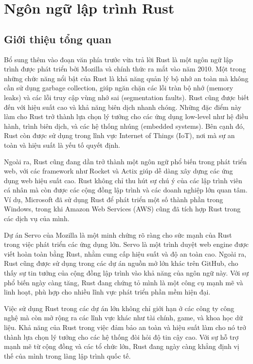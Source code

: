 \section{Ngôn ngữ lập trình Rust}

\subsection{Giới thiệu tổng quan}

Bổ sung thêm vào đoạn văn phía trước vừa trả lời
Rust là một ngôn ngữ lập trình được phát triển bởi Mozilla và chính thức ra mắt vào năm 2010. Một trong những chức năng nổi bật của Rust là khả năng quản lý bộ nhớ an toàn mà không cần sử dụng garbage collection, giúp ngăn chặn các lỗi tràn bộ nhớ (memory leaks) và các lỗi truy cập vùng nhớ sai (segmentation faults). Rust cũng được biết đến với hiệu suất cao và khả năng biên dịch nhanh chóng. Những đặc điểm này làm cho Rust trở thành lựa chọn lý tưởng cho các ứng dụng low-level như hệ điều hành, trình biên dịch, và các hệ thống nhúng (embedded systems). Bên cạnh đó, Rust còn được sử dụng trong lĩnh vực Internet of Things (IoT), nơi mà sự an toàn và hiệu suất là yếu tố quyết định.

Ngoài ra, Rust cũng đang dần trở thành một ngôn ngữ phổ biến trong phát triển web, với các framework như Rocket và Actix giúp dễ dàng xây dựng các ứng dụng web hiệu suất cao. Rust không chỉ thu hút sự chú ý của các lập trình viên cá nhân mà còn được các cộng đồng lập trình và các doanh nghiệp lớn quan tâm. Ví dụ, Microsoft đã sử dụng Rust để phát triển một số thành phần trong Windows, trong khi Amazon Web Services (AWS) cũng đã tích hợp Rust trong các dịch vụ của mình.

Dự án Servo của Mozilla là một minh chứng rõ ràng cho sức mạnh của Rust trong việc phát triển các ứng dụng lớn. Servo là một trình duyệt web engine được viết hoàn toàn bằng Rust, nhằm cung cấp hiệu suất và độ an toàn cao. Ngoài ra, Rust cũng được sử dụng trong các dự án nguồn mở lớn khác trên GitHub, cho thấy sự tin tưởng của cộng đồng lập trình vào khả năng của ngôn ngữ này. Với sự phổ biến ngày càng tăng, Rust đang chứng tỏ mình là một công cụ mạnh mẽ và linh hoạt, phù hợp cho nhiều lĩnh vực phát triển phần mềm hiện đại.

Việc sử dụng Rust trong các dự án lớn không chỉ giới hạn ở các công ty công nghệ mà còn mở rộng ra các lĩnh vực khác như tài chính, game, và khoa học dữ liệu. Khả năng của Rust trong việc đảm bảo an toàn và hiệu suất làm cho nó trở thành lựa chọn lý tưởng cho các hệ thống đòi hỏi độ tin cậy cao. Với sự hỗ trợ mạnh mẽ từ cộng đồng và các tổ chức lớn, Rust đang ngày càng khẳng định vị thế của mình trong làng lập trình quốc tế.

